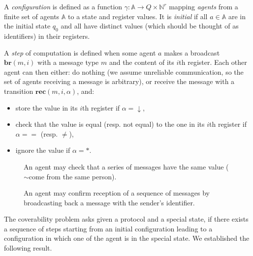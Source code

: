 \documentclass{article}
\newcommand{\nats}{\mathbb{N}}
\theoremstyle{definition}
\begin{document}
		
		A \emph{configuration} is defined as a function $\gamma : \mathbb{A} \to Q \times \nats^{r}$ mapping \emph{agents} from a finite set of agents $\mathbb{A}$ to a state and register values. It is \emph{initial} if all $a \in \mathbb{A}$ are in the initial state $q_0$ and all have distinct values (which should be thought of as identifiers) in their registers. 
			
		A \emph{step} of computation is defined when some agent $a$ makes a broadcast $\mathbf{br}(m,i)$ with a message type $m$ and the content of its $i$th register. Each other agent can then either:
		 do nothing (we assume unreliable communication, so the set of agents receiving a message is arbitrary), or  receive the message with a transition $\mathbf{rec}(m, i, \alpha)$, and:\vspace{-0.3cm}
				\begin{itemize}
					\item store the value in its $i$th register if $\alpha = \downarrow$,
					\item check that the value is equal (resp. not equal) to the one in its $i$th register if $\alpha = =$ (resp. $\neq$),
					\item ignore the value if $\alpha=*$.
				\end{itemize}
	
	\begin{figure}[h]
		\centering
		\begin{minipage}{.47\textwidth}
		\centering
		
		\caption{An agent may check that a series of messages have the same value ($\sim$come from the same person).}
		\label{fig:pred}
		\end{minipage}%
		\hfill
		\begin{minipage}{.47\textwidth}
		\centering
		
		\label{fig:suc}
		\caption{An agent may confirm reception of a sequence of messages by broadcasting back a message with the sender's identifier.}
		\end{minipage}
	\end{figure}
	
	
	The coverability problem asks given a protocol and a special state, if there exists a sequence of steps starting from an initial configuration leading to a configuration in which one of the agent is in the special state. We established the following result.
	
\end{document}
